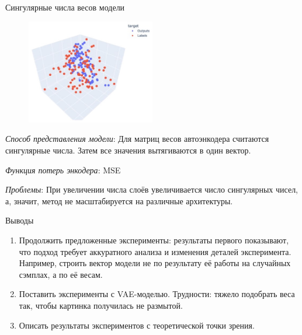 \documentclass{beamer}
\begin{document}
\begin{frame}{Сингулярные числа весов модели}

\begin{figure}
  \vspace{-30pt}
  \begin{center}
    \includegraphics[width=0.5\textwidth]{Pictures/singular.jpg}
  \end{center}
  \vspace{-20pt}
\end{figure}

\textit{Способ представления модели}: Для матриц весов автоэнкодера считаются сингулярные числа. Затем все значения вытягиваются в один вектор.

\bigskip

\textit{Функция потерь энкодера}: MSE

\bigskip

\textit{Проблемы}: При увеличении числа слоёв увеличивается число сингулярных чисел, а, значит, метод не масштабируется на различные архитектуры.
\end{frame}
\begin{frame}{Выводы}
\begin{enumerate}
    \item Продолжить предложенные эксперименты: результаты первого показывают, что подход требует аккуратного анализа и изменения деталей эксперимента. Например, строить вектор модели не по результату её работы на случайных сэмплах, а по её весам.

    \item Поставить эксперименты с VAE-моделью. Трудности: тяжело подобрать веса так, чтобы картинка получилась не размытой.

    \item Описать результаты экспериментов с теоретической точки зрения.
\end{enumerate}
\end{frame}
    
\end{document}
